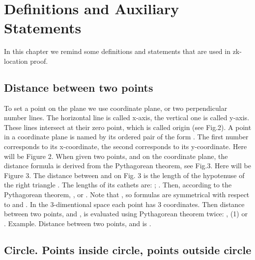 \documentclass{article}
\begin{document}
\section{Definitions and Auxiliary Statements}

In this chapter we remind some definitions and statements that are used in zk-location proof.

\subsection{Distance between two points}  %

To set a point on the plane we use coordinate plane, or two perpendicular number lines.
The horizontal line is called x-axis, the vertical one is called y-axis.
These lines intersect at their zero point, which is called origin (see Fig.2).
A point in a coordinate plane is named by its ordered pair of the form     .
The first number corresponds to its x-coordinate, the second corresponds to its y-coordinate.
Here will be Figure 2.
When given two points,      and      on the coordinate plane, the distance formula is derived from the Pythagorean theorem, see Fig.3.
Here will be Figure 3.
The distance      between      and      on Fig. 3 is the length of the hypotenuse of the right triangle    .
The lengths of its cathets are:     ;     . Then, according to the Pythagorean theorem,
    ,
or
    .
Note that     , so formulas are symmetrical with respect to      and     .
In the 3-dimentional space each point has 3 coordinates.
Then distance between two points,      and     , is evaluated using Pythagorean theorem twice:
    ,                                     (1)
or
    .
Example.
Distance between two points,      and      is
    .

\subsection{Circle. Points inside circle, points outside circle} %
\end{document}
